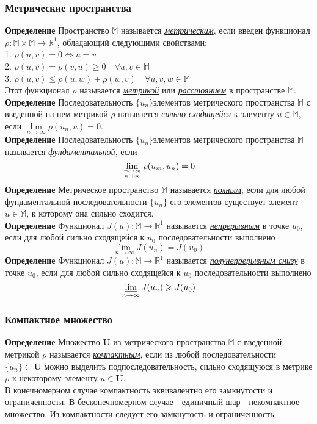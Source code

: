\documentclass[A4]{article}
\begin{document}
\subsubsection{Метрические пространства}
 \textbf{Определение} Пространство $\mathbb{M}$ называется \underline{\emph{метрическим}}, если введен функционал $\rho:\mathbb{M}\times\mathbb{M}\rightarrow\mathbb{R}^1$, обладающий следующими свойствами:\\
1. $\rho(u,v)=0\Leftrightarrow u=v$\\
2. $\rho(u,v)=\rho(v,u)\geqslant0\quad\forall u,v\in\mathbb{M}$\\
3. $\rho(u,v)\leqslant\rho(u,w)+\rho(w,v)\quad\forall u,v,w\in\mathbb{M}$\\
Этот функционал $\rho$ называется \underline{\emph{метрикой}} или \underline{\emph{расстоянием}} в пространстве $\mathbb{M}$.\\
\textbf{Определение} Последовательность $\{u_n\}$элементов метрического пространства $\mathbb{M}$ с введенной на нем метрикой $\rho$ называется \underline{\emph{сильно сходящейся}} к элементу $u\in\mathbb{M}$, если $\lim\limits_{n\rightarrow\infty}\rho(u_n,u)=0$.\\
\textbf{Определение} Последовательность $\{u_n\}$элементов метрического пространства $\mathbb{M}$ называется \underline{\emph{фундаментальной}}, если 
 \begin{equation*}
 \lim _{m \rightarrow \infty \atop n \rightarrow \infty} \rho (u_{m}, u_{n})=0
 \end{equation*}
\textbf{Определение} Метрическое пространство $\mathbb{M}$ называется \underline{\emph{полным}}, если для любой фундаментальной последовательности $\{u_n\}$ его элементов существует элемент $u\in\mathbb{M}$, к которому она сильно сходится. \\
\textbf{Определение} Функционал $J(u):\mathbb{M}\rightarrow\mathbb{R}^1$ называется \underline{\emph{непрерывным}} в точке $u_0$, если для любой сильно сходящейся к $u_0$ последовательности выполнено
\begin{equation*}
\lim_{n\rightarrow\infty}J(u_n)=J(u_0)
\end{equation*}
\textbf{Определение} Функционал $J(u):\mathbb{M}\rightarrow\mathbb{R}^1$ называется \underline{\emph{полунепрерывным снизу}} в точке $u_0$, если для любой сильно сходящейся к $u_0$ последовательности выполнено
\begin{equation*}
\varliminf_{n\rightarrow\infty} J(u_n)\geqslant J(u_0)
\end{equation*}
\subsubsection{Компактное множество}
\textbf{Определение} Множество $\mathbf{U}$ из метрического пространства $\mathbb{M}$ с введенной метрикой $\rho$ называется \underline{\emph{компактным}}, если из любой последовательности $\{u_n\}\subset \mathbf{U}$ можно выделить подпоследовательность, сильно сходящуюся в метрике $\rho$ к некоторому элементу $u\in\mathbf{U}$.\\
В конечномерном случае компактность эквивалентно его замкнутости и ограниченности. В бесконечномерном случае - единичный шар - некомпактное множество. Из компактности следует его замкнутость и ограниченность.
\end{document}
